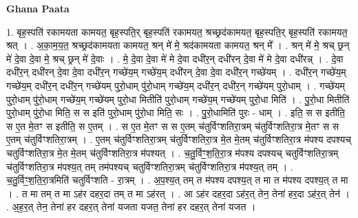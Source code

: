 \documentclass[17pt]{extarticle}
\begin{document}
\textbf{Ghana Paata } \newline

1. बृह॒स्पति॑ रकामयता कामयत॒ बृह॒स्पति॒र् बृह॒स्पति॑ रकामयत॒ श्रच्छ्रद॑कामयत॒ बृह॒स्पति॒र् बृह॒स्पति॑ रकामयत॒ श्रत् । . अ॒का॒म॒य॒त॒ श्रच्छ्रद॑कामयता कामयत॒ श्रन् मे॑ मे॒ श्रद॑कामयता कामयत॒ श्रन् मे᳚ । . श्रन् मे॑ मे॒ श्रच् छ्रन् मे॑ दे॒वा दे॒वा मे॒ श्रच् छ्रन् मे॑ दे॒वाः । . मे॒ दे॒वा दे॒वा मे॑ मे दे॒वा दधी॑र॒न् दधी॑रन् दे॒वा मे॑ मे दे॒वा दधी॑रन्न् । . दे॒वा दधी॑र॒न् दधी॑रन् दे॒वा दे॒वा दधी॑र॒न् गच्छे॑य॒म् गच्छे॑य॒म् दधी॑रन् दे॒वा दे॒वा दधी॑र॒न् गच्छे॑यम् । . दधी॑र॒न् गच्छे॑य॒म् गच्छे॑य॒म् दधी॑र॒न् दधी॑र॒न् गच्छे॑यम् पुरो॒धाम् पु॑रो॒धाम् गच्छे॑य॒म् दधी॑र॒न् दधी॑र॒न् गच्छे॑यम् पुरो॒धाम् । . गच्छे॑यम् पुरो॒धाम् पु॑रो॒धाम् गच्छे॑य॒म् गच्छे॑यम् पुरो॒धा मितीति॑ पुरो॒धाम् गच्छे॑य॒म् गच्छे॑यम् पुरो॒धा मिति॑ । . पु॒रो॒धा मितीति॑ पुरो॒धाम् पु॑रो॒धा मिति॒ स स इति॑ पुरो॒धाम् पु॑रो॒धा मिति॒ सः । . पु॒रो॒धामिति॑ पुरः - धाम् । . इति॒ स स इतीति॒ स ए॒त मे॒तꣳ स इतीति॒ स ए॒तम् । . स ए॒त मे॒तꣳ स स ए॒तम् च॑तुर्विꣳशतिरा॒त्रम् च॑तुर्विꣳशतिरा॒त्र मे॒तꣳ स स ए॒तम् च॑तुर्विꣳशतिरा॒त्रम् । . ए॒तम् च॑तुर्विꣳशतिरा॒त्रम् च॑तुर्विꣳशतिरा॒त्र मे॒त मे॒तम् च॑तुर्विꣳशतिरा॒त्र म॑पश्य दपश्यच् चतुर्विꣳशतिरा॒त्र मे॒त मे॒तम् च॑तुर्विꣳशतिरा॒त्र म॑पश्यत् । . च॒तु॒र्विꣳ॒॒श॒ति॒रा॒त्र म॑पश्य दपश्यच् चतुर्विꣳशतिरा॒त्रम् च॑तुर्विꣳशतिरा॒त्र म॑पश्य॒त् तम् तम॑पश्यच् चतुर्विꣳशतिरा॒त्रम् च॑तुर्विꣳशतिरा॒त्र म॑पश्य॒त् तम् । . च॒तु॒र्विꣳ॒॒श॒ति॒रा॒त्रमिति॑ चतुर्विꣳशति - रा॒त्रम् । . अ॒प॒श्य॒त् तम् त म॑पश्य दपश्य॒त् त मा त म॑पश्य दपश्य॒त् त मा । . त मा तम् त मा ऽह॑र दहर॒दा तम् त मा ऽह॑रत् । . आ ऽह॑र दहर॒दा ऽह॑र॒त् तेन॒ तेना॑ हर॒दा ऽह॑र॒त् तेन॑ । . अ॒ह॒र॒त् तेन॒ तेना॑ हर दहर॒त् तेना॑ यजता यजत॒ तेना॑ हर दहर॒त् तेना॑ यजत । \newline
\end{document}
